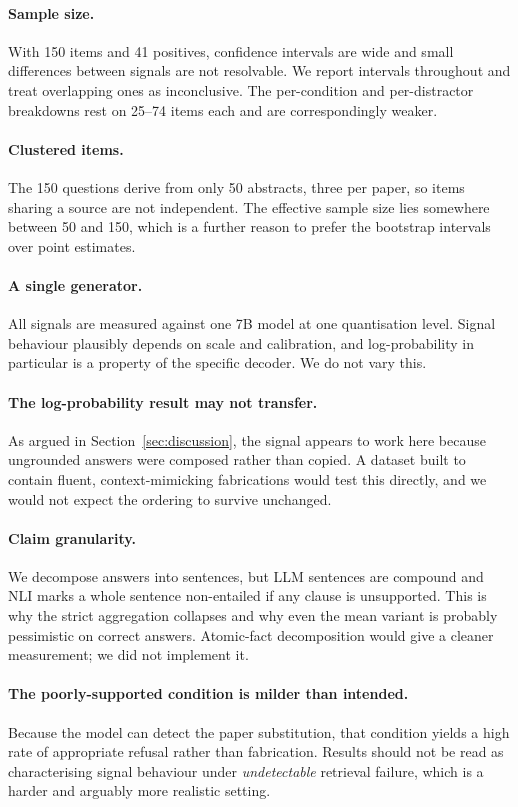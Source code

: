 \documentclass[11pt,a4paper]{article}
\begin{document}
\paragraph{Sample size.}
With 150 items and 41 positives, confidence intervals are wide and small
differences between signals are not resolvable. We report intervals throughout
and treat overlapping ones as inconclusive. The per-condition and
per-distractor breakdowns rest on 25--74 items each and are correspondingly
weaker.

\paragraph{Clustered items.}
The 150 questions derive from only 50 abstracts, three per paper, so items
sharing a source are not independent. The effective sample size lies somewhere
between 50 and 150, which is a further reason to prefer the bootstrap intervals
over point estimates.

\paragraph{A single generator.}
All signals are measured against one 7B model at one quantisation level. Signal
behaviour plausibly depends on scale and calibration, and log-probability in
particular is a property of the specific decoder. We do not vary this.

\paragraph{The log-probability result may not transfer.}
As argued in Section~\ref{sec:discussion}, the signal appears to work here
because ungrounded answers were composed rather than copied. A dataset built to
contain fluent, context-mimicking fabrications would test this directly, and we
would not expect the ordering to survive unchanged.

\paragraph{Claim granularity.}
We decompose answers into sentences, but LLM sentences are compound and NLI
marks a whole sentence non-entailed if any clause is unsupported. This is why
the strict aggregation collapses and why even the mean variant is probably
pessimistic on correct answers. Atomic-fact decomposition would give a cleaner
measurement; we did not implement it.

\paragraph{The poorly-supported condition is milder than intended.}
Because the model can detect the paper substitution, that condition yields a
high rate of appropriate refusal rather than fabrication. Results should not be
read as characterising signal behaviour under \emph{undetectable} retrieval
failure, which is a harder and arguably more realistic setting.
\end{document}

